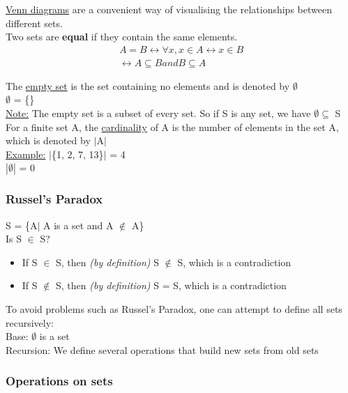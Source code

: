 \documentclass{article}
\begin{document}
\underline{Venn diagrams} are a convenient way of visualising the relationships between different sets. \\

Two sets are \textbf{equal} if they contain the same elements.
\begin{align}
A = B \leftrightarrow \forall x, x\in A \leftrightarrow x \in B \\
\leftrightarrow A \subseteq B and B \subseteq A
\end{align}

The \underline{empty set} is the set containing no elements and is denoted by $\emptyset$\\
$\emptyset$ = \{\} \\

\underline{Note:} The empty set is a subset of every set. So if S is any set, we have $\emptyset \subseteq$ S \\

For a finite set A, the \underline{cardinality} of A is the number of elements in the set A, which is denoted by $|$A$|$ \\

\underline{Example:} $|$\{1, 2, 7, 13\}$|$ = 4\\
$|\emptyset|$ = 0

\subsubsection{Russel's Paradox}

S = \{A$|$ A is a set and A $\notin$ A\} \\

Is S $\in$ S?
\begin{itemize}
\item If S $\in$ S, then \textit{(by definition)} S $\notin$ S, which is a contradiction
\item If S $\notin$ S, then \textit{(by definition)} S = S, which is a contradiction
\end{itemize}

To avoid problems such as Russel's Paradox, one can attempt to define all sets recursively: \\

Base: $\emptyset$ is a set \\
Recursion: We define several operations that build new sets from old sets 

\subsubsection{Operations on sets}
\end{document}
